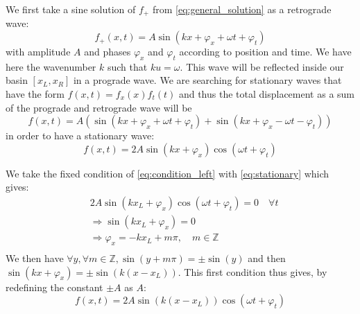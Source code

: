 We first take a sine solution of $f_+$ from \autoref{eq:general_solution} as a retrograde wave:
\begin{equation}
    f_+(x,t) = A \sin(kx + \varphi_x + \omega t + \varphi_t)
\end{equation}
with amplitude $A$ and phases $\varphi_x$ and $\varphi_t$ according to position and time. We have here the wavenumber $k$ such that $ku = \omega$. This wave will be reflected inside our basin $[x_L, x_R]$ in a prograde wave. We are searching for stationary waves that have the form $f(x,t) = f_x(x)f_t(t)$ and thus the total displacement as a sum of the prograde and retrograde wave will be
\begin{equation}
    f(x,t) = A(\sin(kx + \varphi_x + \omega t + \varphi_t) + \sin(kx + \varphi_x - \omega t - \varphi_t))
\end{equation}
in order to have a stationary wave:
\begin{equation}
    f(x,t) = 2A\sin(kx + \varphi_x)\cos(\omega t + \varphi_t)
    \label{eq:stationary}
\end{equation}

We take the fixed condition of \autoref{eq:condition_left} with \autoref{eq:stationary} which gives:
\[
    \begin{aligned}
        & 2A\sin(kx_L + \varphi_x)\cos(\omega t + \varphi_t) = 0 \quad \forall t \\
        & \Rightarrow \sin(kx_L + \varphi_x) = 0 \\
        & \Rightarrow \varphi_x = -kx_L + m\pi, \quad m \in \mathbb{Z}\\
    \end{aligned}    
\]
We then have $\forall y, \forall m \in \mathbb{Z}, \sin(y+m\pi) = \pm \sin(y)$ and then $\sin(kx + \varphi_x) = \pm \sin(k(x-x_L))$. This first condition thus gives, by redefining the constant $\pm A$ as $A$:
\begin{equation}
    f(x,t) = 2A\sin(k(x-x_L))\cos(\omega t + \varphi_t)
    \label{eq:sol_first_condition}
\end{equation}

